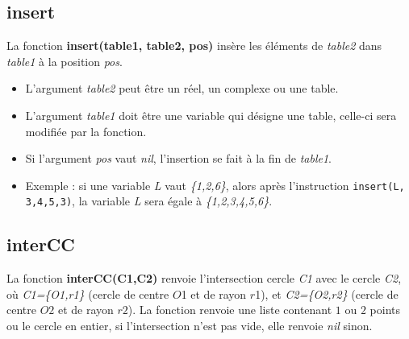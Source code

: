 \subsection{insert}
La fonction \textbf{insert(table1, table2, pos)} insère les éléments de \emph{table2} dans \emph{table1} à la position \emph{pos}.

\begin{itemize}
    \item L'argument \emph{table2} peut être un réel, un complexe ou une table.
    \item L'argument \emph{table1} doit être une variable qui désigne une table, celle-ci sera modifiée par la fonction.
    \item Si l'argument \emph{pos} vaut \emph{nil}, l'insertion se fait à la fin de \emph{table1}.
    \item Exemple : si une variable \emph{L} vaut \emph{\{1,2,6\}}, alors après l'instruction \texttt{insert(L, {3,4,5},3)}, la variable \emph{L} sera égale à \emph{\{1,2,3,4,5,6\}}.
\end{itemize}

\subsection{interCC}
La fonction \textbf{interCC(C1,C2)} renvoie l'intersection cercle \emph{C1} avec le cercle \emph{C2}, où \emph{C1=\{O1,r1\}} (cercle de centre $O$1 et de rayon $r$1), et \emph{C2=\{O2,r2\}} (cercle de centre $O2$ et de rayon $r2$). La fonction renvoie une liste contenant $1$ ou $2$ points ou le cercle en entier,  si l'intersection n'est pas vide, elle renvoie \emph{nil} sinon.

